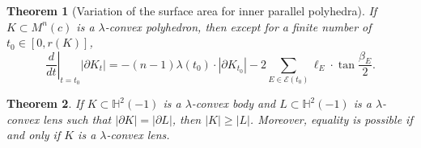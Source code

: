 \documentclass[10pt,a4paper]{amsart}
\newtheorem{theorem}{Theorem}
\newcommand{\Hh}{\mathbb{H}}
\renewcommand{\ge}{\geqslant}
\begin{document}
\begin{theorem}[Variation of the surface area for inner parallel polyhedra]
    \label{Thm:Variation}
    If $K \subset M^n(c)$ is a $\lambda$-convex polyhedron, then except for a finite number of $t_0 \in [0,r(K)]$,
    \[
    \left.\frac{d}{dt}\right|_{t=t_0} |\partial K_t| = -(n-1)\lambda(t_0)\cdot |\partial K_{t_0}| - 2\sum_{E \in \mathcal E(t_0)} \ell_E \cdot \tan\frac{\beta_E}{2}.
    \]
\end{theorem}

\begin{theorem}
    If $K \subset \Hh^2(-1)$ is a $\lambda$-convex body and $L \subset \Hh^2(-1)$ is a $\lambda$-convex lens such that $|\partial K| = |\partial L|$, then $|K| \ge |L|$. Moreover, equality is possible if and only if $K$ is a $\lambda$-convex lens.
\end{theorem}
\end{document}
